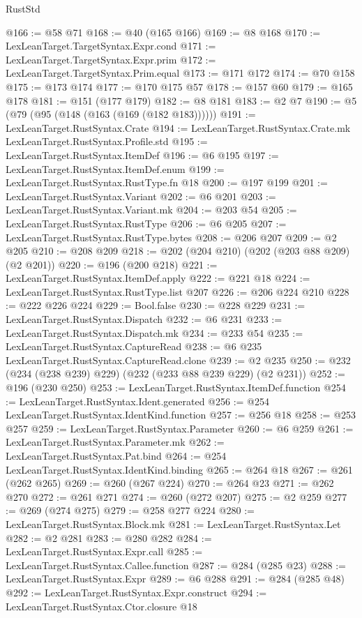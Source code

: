 \begin{lexlean}{RustStd}
\begin{coremodule}
@166 := @58 @71
@168 := @40 (@165 @166)
@169 := @8 @168
@170 := LexLeanTarget.TargetSyntax.Expr.cond
@171 := LexLeanTarget.TargetSyntax.Expr.prim
@172 := LexLeanTarget.TargetSyntax.Prim.equal
@173 := @171 @172
@174 := @70 @158
@175 := @173 @174
@177 := @170 @175 @57
@178 := @157 @60
@179 := @165 @178
@181 := @151 (@177 @179)
@182 := @8 @181
@183 := @2 @7
@190 := @5 (@79 (@95 (@148 (@163 (@169 (@182 @183))))))
@191 := LexLeanTarget.RustSyntax.Crate
@194 := LexLeanTarget.RustSyntax.Crate.mk LexLeanTarget.RustSyntax.Profile.std
@195 := LexLeanTarget.RustSyntax.ItemDef
@196 := @6 @195
@197 := LexLeanTarget.RustSyntax.ItemDef.enum
@199 := LexLeanTarget.RustSyntax.RustType.fn @18
@200 := @197 @199
@201 := LexLeanTarget.RustSyntax.Variant
@202 := @6 @201
@203 := LexLeanTarget.RustSyntax.Variant.mk
@204 := @203 @54
@205 := LexLeanTarget.RustSyntax.RustType
@206 := @6 @205
@207 := LexLeanTarget.RustSyntax.RustType.bytes
@208 := @206 @207
@209 := @2 @205
@210 := @208 @209
@218 := @202 (@204 @210) (@202 (@203 @88 @209) (@2 @201))
@220 := @196 (@200 @218)
@221 := LexLeanTarget.RustSyntax.ItemDef.apply
@222 := @221 @18
@224 := LexLeanTarget.RustSyntax.RustType.list @207
@226 := @206 @224 @210
@228 := @222 @226 @224
@229 := Bool.false
@230 := @228 @229
@231 := LexLeanTarget.RustSyntax.Dispatch
@232 := @6 @231
@233 := LexLeanTarget.RustSyntax.Dispatch.mk
@234 := @233 @54
@235 := LexLeanTarget.RustSyntax.CaptureRead
@238 := @6 @235 LexLeanTarget.RustSyntax.CaptureRead.clone
@239 := @2 @235
@250 := @232 (@234 (@238 @239) @229) (@232 (@233 @88 @239 @229) (@2 @231))
@252 := @196 (@230 @250)
@253 := LexLeanTarget.RustSyntax.ItemDef.function
@254 := LexLeanTarget.RustSyntax.Ident.generated
@256 := @254 LexLeanTarget.RustSyntax.IdentKind.function
@257 := @256 @18
@258 := @253 @257
@259 := LexLeanTarget.RustSyntax.Parameter
@260 := @6 @259
@261 := LexLeanTarget.RustSyntax.Parameter.mk
@262 := LexLeanTarget.RustSyntax.Pat.bind
@264 := @254 LexLeanTarget.RustSyntax.IdentKind.binding
@265 := @264 @18
@267 := @261 (@262 @265)
@269 := @260 (@267 @224)
@270 := @264 @23
@271 := @262 @270
@272 := @261 @271
@274 := @260 (@272 @207)
@275 := @2 @259
@277 := @269 (@274 @275)
@279 := @258 @277 @224
@280 := LexLeanTarget.RustSyntax.Block.mk
@281 := LexLeanTarget.RustSyntax.Let
@282 := @2 @281
@283 := @280 @282
@284 := LexLeanTarget.RustSyntax.Expr.call
@285 := LexLeanTarget.RustSyntax.Callee.function
@287 := @284 (@285 @23)
@288 := LexLeanTarget.RustSyntax.Expr
@289 := @6 @288
@291 := @284 (@285 @48)
@292 := LexLeanTarget.RustSyntax.Expr.construct
@294 := LexLeanTarget.RustSyntax.Ctor.closure @18

\end{coremodule}
\end{lexlean}
